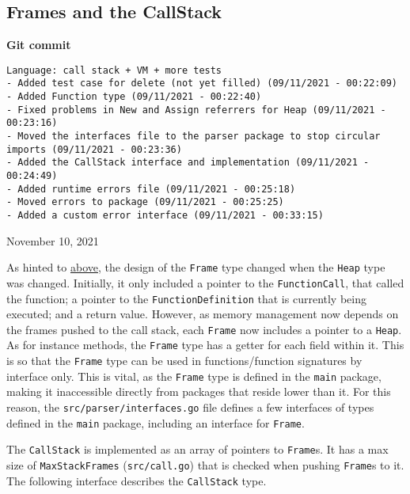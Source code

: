 \subsection{Frames and the CallStack}
\label{sec:data-structures-frames-callstack}

\begin{center}
    \textbf{Git commit}
    \begin{verbatim}
Language: call stack + VM + more tests
- Added test case for delete (not yet filled) (09/11/2021 - 00:22:09)
- Added Function type (09/11/2021 - 00:22:40)
- Fixed problems in New and Assign referrers for Heap (09/11/2021 - 00:23:16)
- Moved the interfaces file to the parser package to stop circular imports (09/11/2021 - 00:23:36)
- Added the CallStack interface and implementation (09/11/2021 - 00:24:49)
- Added runtime errors file (09/11/2021 - 00:25:18)
- Moved errors to package (09/11/2021 - 00:25:25)
- Added a custom error interface (09/11/2021 - 00:33:15)
    \end{verbatim}
    \vspace{-1em}
    \tiny{November 10, 2021}
\end{center}

As hinted to \hyperref[sec:data-structures-heap]{above}, the design of the \verb|Frame| type changed when the \verb|Heap| type was changed. Initially, it only included a pointer to the \verb|FunctionCall|, that called the function; a pointer to the \verb|FunctionDefinition| that is currently being executed; and a return value. However, as memory management now depends on the frames pushed to the call stack, each \verb|Frame| now includes a pointer to a \verb|Heap|. As for instance methods, the \verb|Frame| type has a getter for each field within it. This is so that the \verb|Frame| type can be used in functions/function signatures by interface only. This is vital, as the \verb|Frame| type is defined in the \verb|main| package, making it inaccessible directly from packages that reside lower than it. For this reason, the \verb|src/parser/interfaces.go| file defines a few interfaces of types defined in the \verb|main| package, including an interface for \verb|Frame|.

The \verb|CallStack| is implemented as an array of pointers to \verb|Frame|s. It has a max size of \verb|MaxStackFrames| (\verb|src/call.go|) that is checked when pushing \verb|Frame|s to it. The following interface describes the \verb|CallStack| type.

\inputminted[firstline=64, lastline=77, autogobble, breaklines, tabsize=4]{go}{../../src/parser/interfaces.go}

